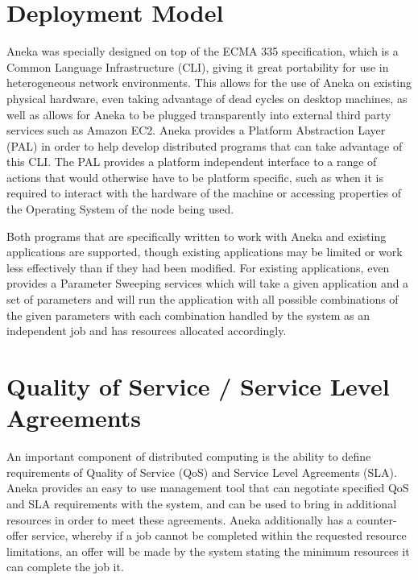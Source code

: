 \section{Deployment Model}
Aneka was specially designed on top of the ECMA 335 specification, which is a Common Language Infrastructure (CLI), giving it great portability for use in heterogeneous network environments. This allows for the use of Aneka on existing physical hardware, even taking advantage of dead cycles on desktop machines, as well as allows for Aneka to be plugged transparently into external third party services such as Amazon EC2. Aneka provides a Platform Abstraction Layer (PAL) in order to help develop distributed programs that can take advantage of this CLI. The PAL provides a platform independent interface to a range of actions that would otherwise have to be platform specific, such as when it is required to interact with the hardware of the machine or accessing properties of the Operating System of the node being used.

Both programs that are specifically written to work with Aneka and existing applications are supported, though existing applications may be limited or work less effectively than if they had been modified. For existing applications, even provides a Parameter Sweeping services which will take a given application and a set of parameters and will run the application with all possible combinations of the given parameters with each combination handled by the system as an independent job and has resources allocated accordingly.

\section{Quality of Service / Service Level Agreements}
An important component of distributed computing is the ability to define requirements of Quality of Service (QoS) and Service Level Agreements (SLA). Aneka provides an easy to use management tool that can negotiate specified QoS and SLA requirements with the system, and can be used to bring in additional resources in order to meet these agreements. Aneka additionally has a counter-offer service, whereby if a job cannot be completed within the requested resource limitations, an offer will be made by the system stating the minimum resources it can complete the job it.

